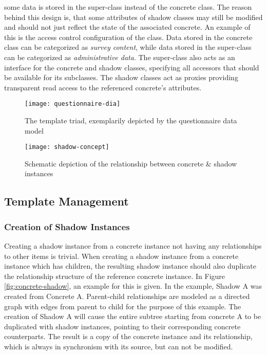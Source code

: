        some data is stored in the super-class instead of the concrete class.
        The reason behind this design is, that some attributes of shadow classes
        may still be modified and should not just reflect the state of the associated
        concrete. An example of this is the access control configuration
        of the  class. Data stored in the concrete
        class can be categorized as \textit{survey content}, while data
        stored in the super-class can be categorized as \textit{administrative data}.
        The super-class also acts as an interface for the concrete and shadow classes,
        specifying all accessors that should be available for its subclasses.
        The shadow classes act as proxies providing transparent read access to the
        referenced concrete's attributes.

        \begin{figure}[H]
            \centering
            \texttt{[image: questionnaire-dia]}
            \caption{The template triad, exemplarily depicted by the questionnaire data model}
            \label{fig:questionnaire-dia}
        \end{figure}

        \pagebreak

        \begin{wrapfigure}{o}{.5\textwidth}
            \centering
            \texttt{[image: shadow-concept]}
            \caption{Schematic depiction of the relationship between concrete \& shadow instances}
            \label{fig:shadow-concept}
        \end{wrapfigure}

\subsection{Template Management}
\label{implementation:template-management}

    \subsubsection{Creation of Shadow Instances}
        Creating a shadow instance from a concrete instance not having
        any relationships to other items is trivial.
        When creating a shadow instance from a concrete instance
        which has children, the resulting shadow
        instance should also duplicate the relationship structure
        of the reference concrete instance. In Figure \ref{fig:concrete-shadow},
        an example for this is given. In the example, Shadow A
        was created from Concrete A. Parent-child relationships
        are modeled as a directed graph with edges from parent to child for the 
        purpose of this example. The creation of Shadow A will cause the
        entire subtree starting from concrete A to be duplicated
        with shadow instances, pointing to their corresponding
        concrete counterparts. The result is a copy of the
        concrete instance and its relationship, which is always
        in synchronism with its source, but can not be modified.

